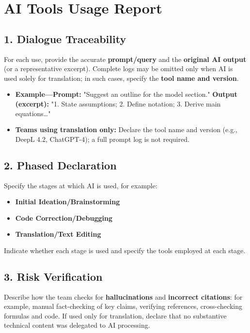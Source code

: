 \section*{AI Tools Usage Report}\subsection*{1. Dialogue Traceability}For each use, provide the accurate \textbf{prompt/query} and the \textbf{original AI output} (or a representative excerpt). Complete logs may be omitted only when AI is used solely for translation; in such cases, specify the \textbf{tool name and version}.\begin{itemize}[leftmargin=*]
    \item \textbf{Example---Prompt:} "Suggest an outline for the model section." \textbf{Output (excerpt):} "1. State assumptions; 2. Define notation; 3. Derive main equations\ldots"
    \item \textbf{Teams using translation only:} Declare the tool name and version (e.g., DeepL 4.2, ChatGPT-4); a full prompt log is not required.
\end{itemize}\subsection*{2. Phased Declaration}Specify the stages at which AI is used, for example:
\begin{itemize}[leftmargin=*]
    \item \textbf{Initial Ideation/Brainstorming}
    \item \textbf{Code Correction/Debugging}
    \item \textbf{Translation/Text Editing}
\end{itemize}
Indicate whether each stage is used and specify the tools employed at each stage.\subsection*{3. Risk Verification}Describe how the team checks for \textbf{hallucinations} and \textbf{incorrect citations}: for example, manual fact-checking of key claims, verifying references, cross-checking formulas and code. If used only for translation, declare that no substantive technical content was delegated to AI processing.
